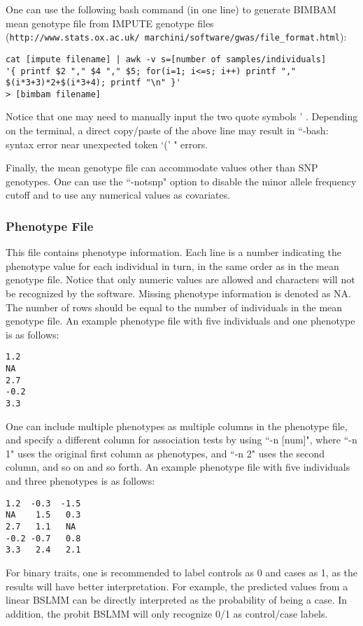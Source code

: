 \documentclass[11pt]{article}
\providecommand{\url}[1]{\texttt{#1}}
\begin{document}
One can use the following bash command (in one line) to generate
BIMBAM mean genotype file from IMPUTE genotype files
(\url{http://www.stats.ox.ac.uk/~marchini/software/gwas/file_format.html})\cite{Howie:2009}:
%
\begin{verbatim}
cat [impute filename] | awk -v s=[number of samples/individuals]
'{ printf $2 "," $4 "," $5; for(i=1; i<=s; i++) printf "," $(i*3+3)*2+$(i*3+4); printf "\n" }'
> [bimbam filename]
\end{verbatim}
%
Notice that one may need to manually input the two quote symbols '
. Depending on the terminal, a direct copy/paste of the above line may
result in ``-bash: syntax error near unexpected token `(' " errors.

Finally, the mean genotype file can accommodate values other than SNP
genotypes. One can use the ``-notsnp" option to disable the minor
allele frequency cutoff and to use any numerical values as covariates.

\subsubsection{Phenotype File}

This file contains phenotype information. Each line is a number
indicating the phenotype value for each individual in turn, in the
same order as in the mean genotype file. Notice that only numeric
values are allowed and characters will not be recognized by the
software. Missing phenotype information is denoted as NA. The number
of rows should be equal to the number of individuals in the mean
genotype file. An example phenotype file with five individuals and one
phenotype is as follows:
%
\begin{verbatim}
1.2
NA
2.7
-0.2
3.3
\end{verbatim}
%
One can include multiple phenotypes as multiple columns in the
phenotype file, and specify a different column for association tests
by using ``-n [num]", where ``-n 1" uses the original first column as
phenotypes, and ``-n 2" uses the second column, and so on and so
forth. An example phenotype file with five individuals and three
phenotypes is as follows:
%
\begin{verbatim}
1.2  -0.3  -1.5
NA    1.5   0.3
2.7   1.1   NA
-0.2 -0.7   0.8
3.3   2.4   2.1
\end{verbatim}
%
For binary traits, one is recommended to label controls as 0 and cases
as 1, as the results will have better interpretation. For example, the
predicted values from a linear BSLMM can be directly interpreted as
the probability of being a case. In addition, the probit BSLMM will
only recognize 0/1 as control/case labels.
\end{document}
